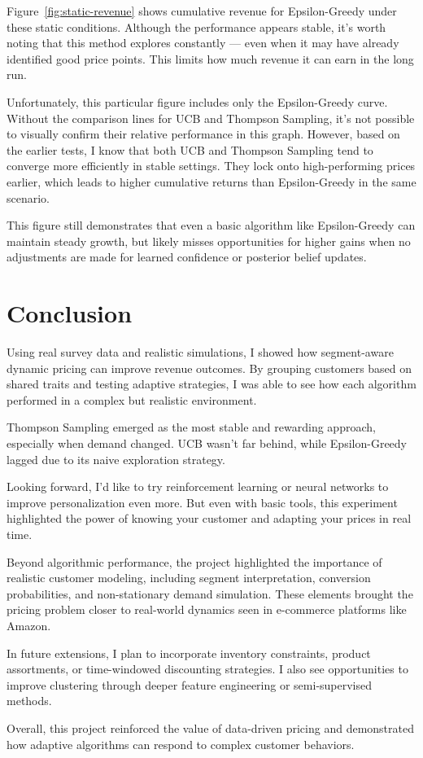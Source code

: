 \documentclass[12pt]{article}
\begin{document}
Figure~\ref{fig:static-revenue} shows cumulative revenue for Epsilon-Greedy under these static conditions. Although the performance appears stable, it’s worth noting that this method explores constantly — even when it may have already identified good price points. This limits how much revenue it can earn in the long run.

Unfortunately, this particular figure includes only the Epsilon-Greedy curve. Without the comparison lines for UCB and Thompson Sampling, it’s not possible to visually confirm their relative performance in this graph. However, based on the earlier tests, I know that both UCB and Thompson Sampling tend to converge more efficiently in stable settings. They lock onto high-performing prices earlier, which leads to higher cumulative returns than Epsilon-Greedy in the same scenario.

This figure still demonstrates that even a basic algorithm like Epsilon-Greedy can maintain steady growth, but likely misses opportunities for higher gains when no adjustments are made for learned confidence or posterior belief updates.


\section{Conclusion}

Using real survey data and realistic simulations, I showed how segment-aware dynamic pricing can improve revenue outcomes. By grouping customers based on shared traits and testing adaptive strategies, I was able to see how each algorithm performed in a complex but realistic environment.

Thompson Sampling emerged as the most stable and rewarding approach, especially when demand changed. UCB wasn’t far behind, while Epsilon-Greedy lagged due to its naive exploration strategy.

Looking forward, I’d like to try reinforcement learning or neural networks to improve personalization even more. But even with basic tools, this experiment highlighted the power of knowing your customer and adapting your prices in real time.

Beyond algorithmic performance, the project highlighted the importance of realistic customer modeling, including segment interpretation, conversion probabilities, and non-stationary demand simulation. These elements brought the pricing problem closer to real-world dynamics seen in e-commerce platforms like Amazon.

In future extensions, I plan to incorporate inventory constraints, product assortments, or time-windowed discounting strategies. I also see opportunities to improve clustering through deeper feature engineering or semi-supervised methods.

Overall, this project reinforced the value of data-driven pricing and demonstrated how adaptive algorithms can respond to complex customer behaviors.
\end{document}
